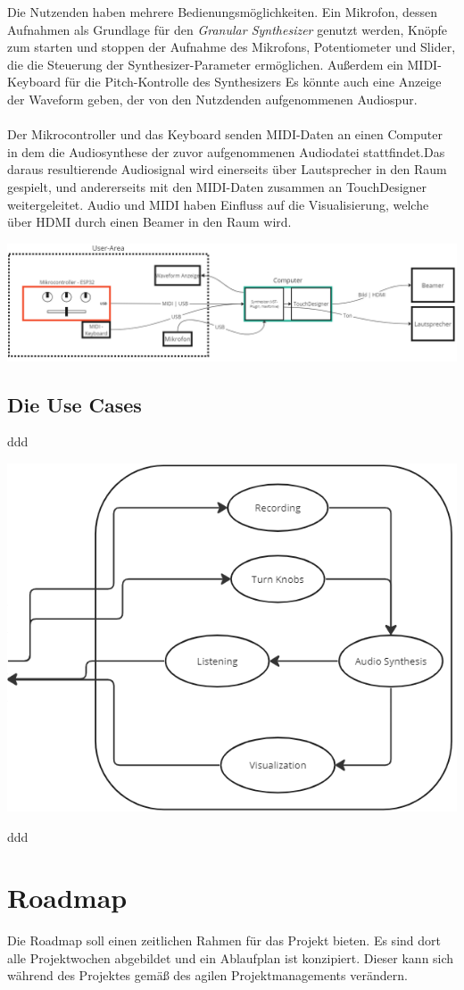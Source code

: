 \documentclass[12pt]{scrartcl}%
\theoremstyle{nonumberplain}
\begin{document}
Die Nutzenden haben mehrere Bedienungsmöglichkeiten. Ein Mikrofon, dessen Aufnahmen als Grundlage für den \emph{Granular Synthesizer} genutzt werden, Knöpfe zum starten und stoppen der Aufnahme des Mikrofons, Potentiometer und Slider, die die Steuerung der Synthesizer-Parameter ermöglichen. Außerdem ein MIDI-Keyboard für die Pitch-Kontrolle des Synthesizers
Es könnte auch eine Anzeige der Waveform geben, der von den Nutzdenden aufgenommenen Audiospur.\\\\
Der Mikrocontroller und das Keyboard senden MIDI-Daten an einen Computer in dem die Audiosynthese der zuvor aufgenommenen Audiodatei stattfindet.Das daraus resultierende Audiosignal wird einerseits über Lautsprecher in den Raum gespielt, und andererseits mit den MIDI-Daten zusammen an TouchDesigner weitergeleitet. Audio und MIDI haben Einfluss auf die Visualisierung, welche über HDMI durch einen Beamer in den Raum  wird.
\begin{center}
 \includegraphics[scale=0.43]{system_schaltbild_v1.png}
\end{center}
\newpage
\subsection{Die Use Cases}
ddd
\begin{center}
 \includegraphics[scale=0.5]{usecases.png}
\end{center}
ddd
\section{Roadmap}

Die Roadmap soll einen zeitlichen Rahmen für das Projekt bieten. Es sind dort alle Projektwochen abgebildet und ein Ablaufplan ist konzipiert. Dieser kann sich während des Projektes gemäß des agilen Projektmanagements verändern.
\end{document}
